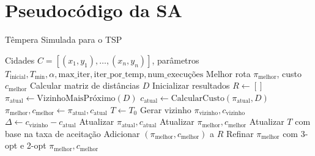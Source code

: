 \documentclass[11pt]{article}
\begin{document}
\section{Pseudocódigo da SA}\label{app:sa}
\begin{algorithm}
    \caption{Têmpera Simulada para o TSP}
    \begin{algorithmic}[1]
        \Require Cidades \(C = [(x_1, y_1), \ldots, (x_n, y_n)]\), parâmetros \(T_{\text{inicial}}, T_{\text{min}}, \alpha, \text{max\_iter}, \text{iter\_por\_temp}, \text{num\_execuções}\)
        \Ensure Melhor rota \(\pi_{\text{melhor}}\), custo \(c_{\text{melhor}}\)
        \State Calcular matriz de distâncias \(D\)
        \State Inicializar resultados \(R \gets []\)
            \State \(\pi_{\text{atual}} \gets \text{VizinhoMaisPróximo}(D)\)
            \State \(c_{\text{atual}} \gets \text{CalcularCusto}(\pi_{\text{atual}}, D)\)
            \State \(\pi_{\text{melhor}}, c_{\text{melhor}} \gets \pi_{\text{atual}}, c_{\text{atual}}\)
            \State \(T \gets T_0\)
                \State Gerar vizinho \(\pi_{\text{vizinho}}, c_{\text{vizinho}}\)
                \State \(\Delta \gets c_{\text{vizinho}} - c_{\text{atual}}\)
                    \State Atualizar \(\pi_{\text{atual}}, c_{\text{atual}}\)
                        \State Atualizar \(\pi_{\text{melhor}}, c_{\text{melhor}}\)
                    \EndIf
                \EndIf
                \State Atualizar \(T\) com base na taxa de aceitação
            \EndWhile
            \State Adicionar \((\pi_{\text{melhor}}, c_{\text{melhor}})\) a \(R\)
        \EndFor
        \State Refinar \(\pi_{\text{melhor}}\) com 3-opt e 2-opt
        \State \Return \(\pi_{\text{melhor}}, c_{\text{melhor}}\)
    \end{algorithmic}
\end{algorithm}

\clearpage
\end{document}
